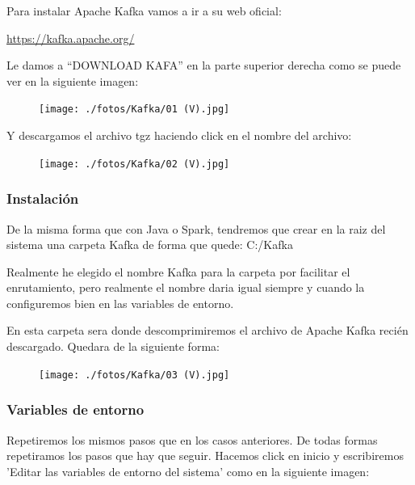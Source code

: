 \documentclass[a4paper,10pt]{article}
\begin{document}
Para instalar Apache Kafka vamos a ir a su web oficial:

\begin{center}
\href{https://kafka.apache.org/}{https://kafka.apache.org/}  
\end{center}

Le damos a “DOWNLOAD KAFA” en la parte superior derecha como se puede ver en la siguiente imagen: 

\begin{figure}[H]
\begin{center}
\texttt{[image: ./fotos/Kafka/01 (V).jpg]}
\end{center}
\end{figure}

Y descargamos el archivo tgz haciendo click en el nombre del archivo: 

\begin{figure}[H]
\begin{center}
\texttt{[image: ./fotos/Kafka/02 (V).jpg]}
\end{center}
\end{figure} 

\subsubsection{Instalación}

De la misma forma que con Java o Spark, tendremos que crear en la raiz del sistema una carpeta Kafka de forma que quede: C:/Kafka

Realmente he elegido el nombre Kafka para la carpeta por facilitar el enrutamiento, pero realmente el nombre daria igual siempre y cuando la configuremos bien en las variables de entorno. 

En esta carpeta sera donde descomprimiremos el archivo de Apache Kafka recién descargado. Quedara de la siguiente forma: 

\begin{figure}[H]
\begin{center}
\texttt{[image: ./fotos/Kafka/03 (V).jpg]}
\end{center}
\end{figure}

\subsubsection{Variables de entorno}

Repetiremos los mismos pasos que en los casos anteriores. De todas formas repetiramos los pasos que hay que seguir. Hacemos click en inicio y escribiremos 'Editar las variables de entorno del sistema' como en la siguiente imagen:
\end{document}
